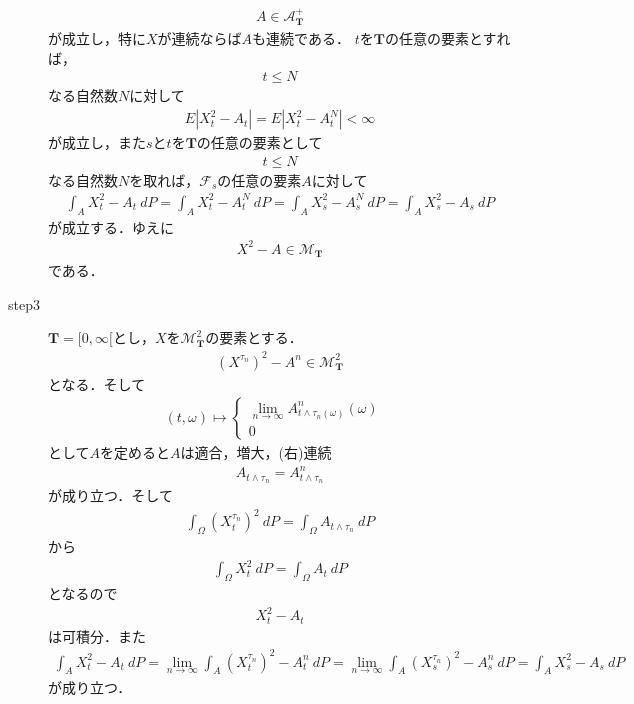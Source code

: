 \begin{sketch}
\begin{description}
\begin{align}
					A \in \mathscr{A}^+_{\mathbf{T}}
				\end{align}
				が成立し，特に$X$が連続ならば$A$も連続である．
				$t$を$\mathbf{T}$の任意の要素とすれば，
				\begin{align}
					t \leq N
				\end{align}
				なる自然数$N$に対して
				\begin{align}
					E\left|X^2_t - A_t\right| = E\left|X^2_t - A^N_t\right| < \infty
				\end{align}
				が成立し，また$s$と$t$を$\mathbf{T}$の任意の要素として
				\begin{align}
					t \leq N
				\end{align}
				なる自然数$N$を取れば，$\mathscr{F}_s$の任意の要素$A$に対して
				\begin{align}
					\int_A X^2_t - A_t\ dP
					= \int_A X^2_t - A^N_t\ dP
					= \int_A X^2_s - A^N_s\ dP
					= \int_A X^2_s - A_s\ dP
				\end{align}
				が成立する．ゆえに
				\begin{align}
					X^2 - A \in \mathscr{M}_{\mathbf{T}}
				\end{align}
				である．
				
			\item[step3]
				$\mathbf{T}=[0,\infty[$とし，$X$を$\mathscr{M}^2_{\mathbf{T}}$の要素とする．
				\begin{align}
					\left(X^{\tau_n}\right)^2 - A^n \in \mathscr{M}^2_{\mathbf{T}}
				\end{align}
				となる．そして
				\begin{align}
					(t,\omega) \longmapsto
					\begin{cases}
						\lim_{n \to \infty} A^n_{t \wedge \tau_n(\omega)}(\omega) & \\
						0
					\end{cases}
				\end{align}
				として$A$を定めると$A$は適合，増大，(右)連続
				\begin{align}
					A_{t \wedge \tau_n} = A^n_{t \wedge \tau_n}
				\end{align}
				が成り立つ．そして
				\begin{align}
					\int_\Omega \left(X^{\tau_n}_t\right)^2\ dP = \int_\Omega A_{t \wedge \tau_n}\ dP
				\end{align}
				から
				\begin{align}
					\int_\Omega X_t^2\ dP = \int_\Omega A_t\ dP
				\end{align}
				となるので
				\begin{align}
					X_t^2 - A_t
				\end{align}
				は可積分．また
				\begin{align}
					\int_A X_t^2 - A_t\ dP
					= \lim_{n \to \infty} \int_A \left(X^{\tau_n}_t\right)^2 - A^n_t\ dP
					= \lim_{n \to \infty} \int_A \left(X^{\tau_n}_s\right)^2 - A^n_s\ dP
					= \int_A X_s^2 - A_s\ dP
				\end{align}
				が成り立つ．
				

\end{description}
\end{sketch}
